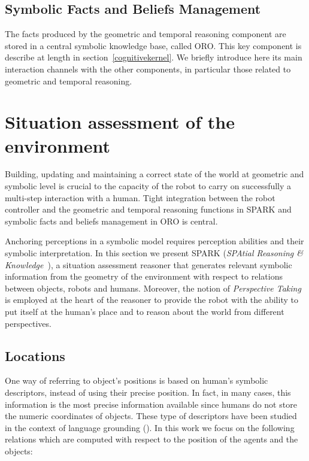 \documentclass{svmult}
\begin{document}
\subsection{Symbolic Facts and Beliefs Management}

The facts produced by the geometric and temporal reasoning component are stored
in a central symbolic knowledge base, called ORO. This key component is
describe at length in section~\ref{cognitivekernel}. We briefly introduce here
its main interaction channels with the other components, in particular those
related to geometric and temporal reasoning.




\section{Situation assessment of the environment}
\label{sec:situ}

Building, updating and maintaining a correct state of the world at
geometric and symbolic level is crucial to the capacity of the robot
to carry on successfully a multi-step interaction with a human. Tight
integration between the robot controller and the geometric and
temporal reasoning functions in SPARK and symbolic facts and beliefs
management in ORO is central.


Anchoring perceptions in a symbolic model requires perception abilities
and their symbolic interpretation. In this section we present
SPARK (\emph{SPAtial Reasoning \& Knowledge}~\cite{Sisbot2011}), a situation assessment reasoner
that generates relevant symbolic information from the geometry of the
environment with respect to relations between objects, robots and humans.
Moreover, the notion of \emph{Perspective
Taking}~\cite{Flavell1992,Tversky1999} is employed at the heart of the
reasoner to provide the robot with the ability to put itself at the human's
place and to reason about the world from different perspectives.


\subsection{Locations}

One way of referring to object's positions is based on human's symbolic 
descriptors, instead of using their precise position. In fact, in many cases, 
this information is the most precise information available since humans do not 
store the numeric coordinates of objects. These type of descriptors have been 
studied in the context of language grounding 
(\cite{O'Keefe1999,Matuszek2010,Regier2001,Kelleher2009,Blisard2005}). In this 
work we focus on the following relations which are computed with respect to the 
position of the agents and the objects:
\end{document}
